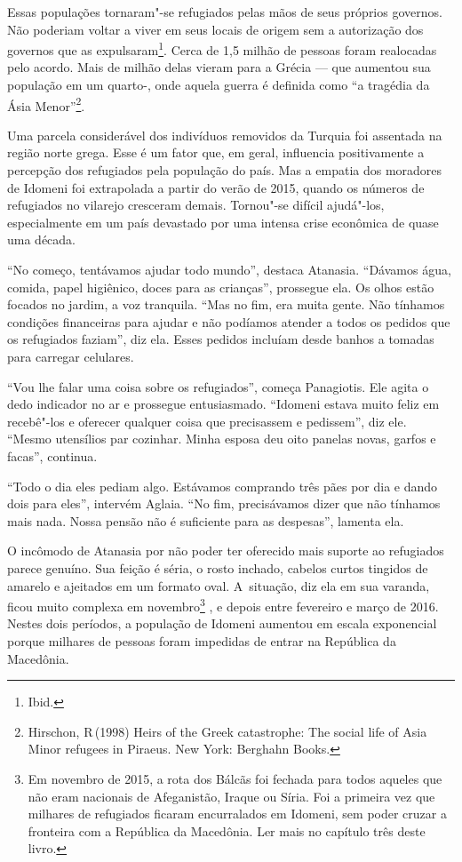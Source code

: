 Essas populações tornaram"-se refugiados pelas mãos de seus próprios
governos. Não poderiam voltar a viver em seus locais de origem sem a
autorização dos governos que as expulsaram\footnote{ Ibid.}. Cerca
de 1,5 milhão de pessoas foram realocadas pelo acordo. Mais de milhão
delas vieram para a Grécia --- que aumentou sua população em um quarto-,
onde aquela guerra é definida como ``a tragédia da Ásia
Menor''\footnote{ Hirschon, R\,(1998) Heirs of the Greek
catastrophe: The social life of Asia Minor refugees in Piraeus. New
York: Berghahn Books.}.

Uma parcela considerável dos indivíduos removidos da Turquia foi
assentada na região norte grega. Esse é um fator que, em geral,
influencia positivamente a percepção dos refugiados pela população do
país. Mas a empatia dos moradores de Idomeni foi extrapolada a partir do
verão de 2015, quando os números de refugiados no vilarejo cresceram
demais. Tornou"-se difícil ajudá"-los, especialmente em um país devastado
por uma intensa crise econômica de quase uma década.

``No começo, tentávamos ajudar todo mundo'', destaca Atanasia. ``Dávamos
água, comida, papel higiênico, doces para as crianças'', prossegue ela.
Os olhos estão focados no jardim, a voz tranquila. ``Mas no fim, era
muita gente. Não tínhamos condições financeiras para ajudar e não
podíamos atender a todos os pedidos que os refugiados faziam'', diz ela.
Esses pedidos incluíam desde banhos a tomadas para carregar celulares.

``Vou lhe falar uma coisa sobre os refugiados'', começa Panagiotis. Ele
agita o dedo indicador no ar e prossegue entusiasmado. ``Idomeni estava
muito feliz em recebê"-los e oferecer qualquer coisa que precisassem e
pedissem'', diz ele. ``Mesmo utensílios par cozinhar. Minha esposa deu
oito panelas novas, garfos e facas'', continua.

``Todo o dia eles pediam algo. Estávamos comprando três pães por dia e
dando dois para eles'', intervém Aglaia. ``No fim, precisávamos dizer
que não tínhamos mais nada. Nossa pensão não é suficiente para as
despesas'', lamenta ela.

O incômodo de Atanasia por não poder ter oferecido mais suporte ao
refugiados parece genuíno. Sua feição é séria, o rosto inchado, cabelos
curtos tingidos de amarelo e ajeitados em um formato oval. A~situação,
diz ela em sua varanda, ficou muito complexa em
novembro\footnote{ Em novembro de 2015, a rota dos Bálcãs foi
fechada para todos aqueles que não eram nacionais de Afeganistão, Iraque
ou Síria. Foi a primeira vez que milhares de refugiados ficaram
encurralados em Idomeni, sem poder cruzar a fronteira com a República da
Macedônia. Ler mais no capítulo três deste livro.} , e depois entre fevereiro e março de
2016. Nestes dois períodos, a população de Idomeni aumentou em escala
exponencial porque milhares de pessoas foram impedidas de entrar na
República da Macedônia.

